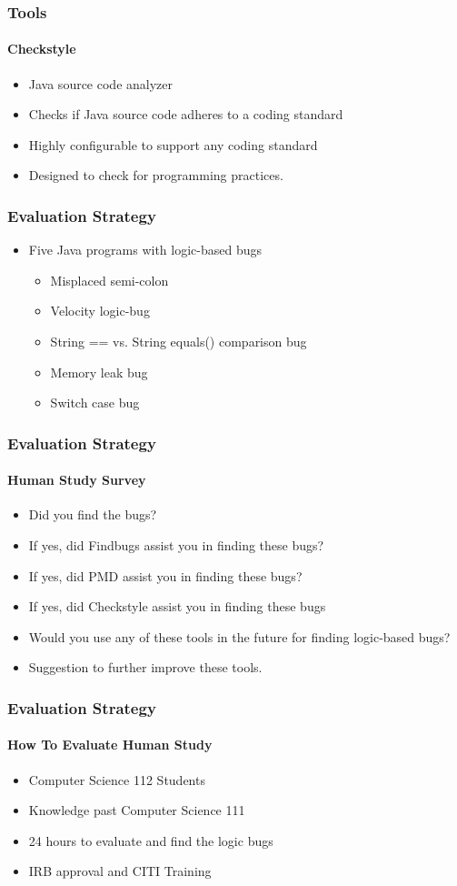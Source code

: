 \documentclass{beamer}
\begin{document}
\begin{frame}
\frametitle{Tools}
\framesubtitle{Checkstyle}
\begin{itemize}
\item<1-> Java source code analyzer
\item<2-> Checks if Java source code adheres to a coding standard
\item<3-> Highly configurable to support any coding standard
\item<4-> Designed to check for programming practices.
\end{itemize}
\end{frame}


\begin{frame}
\frametitle{Evaluation Strategy}
\begin{itemize}
\item<1-> Five Java programs with logic-based bugs
\begin{itemize}
\item<2-> Misplaced semi-colon
\item<3-> Velocity logic-bug
\item<4-> String == vs. String equals() comparison bug
\item<5-> Memory leak bug
\item<6-> Switch case bug
\end{itemize}
\end{itemize}
\end{frame}

\begin{frame}
\frametitle{Evaluation Strategy}
\framesubtitle{Human Study Survey}
\begin{itemize}
\item<1-> Did you find the bugs?
\item<2-> If yes, did Findbugs assist you in finding these bugs?
\item<3-> If yes, did PMD assist you in finding these bugs?
\item<4-> If yes, did Checkstyle assist you in finding these bugs
\item<5-> Would you use any of these tools in the future for finding logic-based bugs?
\item<6-> Suggestion to further improve these tools.
\end{itemize}
\end{frame}

\begin{frame}
\frametitle{Evaluation Strategy}
\framesubtitle{How To Evaluate Human Study}
\begin{itemize}
\item<1-> Computer Science 112 Students
\item<2-> Knowledge past Computer Science 111
\item<3-> 24 hours to evaluate and find the logic bugs
\item<4-> IRB approval and CITI Training
\end{itemize}
\end{frame}
\end{document}
